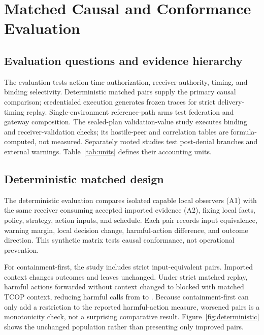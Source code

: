 \section{Matched Causal and Conformance Evaluation}

\subsection{Evaluation questions and evidence hierarchy}

The evaluation tests action-time authorization, receiver authority, timing, and binding selectivity. Deterministic matched pairs supply the primary causal comparison; credentialed execution generates frozen traces for strict delivery-timing replay. Single-environment reference-path arms test federation and gateway composition. The sealed-plan validation-value study executes binding and receiver-validation checks; its hostile-peer and correlation tables are formula-computed, not measured. Separately rooted studies test post-denial branches and external warnings. Table~\ref{tab:units} defines their accounting units.



\subsection{Deterministic matched design}

The deterministic evaluation compares isolated capable local observers (A1) with the same receiver consuming accepted imported evidence (A2), fixing local facts, policy, strategy, action inputs, and schedule. Each pair records input equivalence, warning margin, local decision change, harmful-action difference, and outcome direction. This synthetic matrix tests causal conformance, not operational prevention.

For containment-first, the study includes \DeterministicPairs{} strict input-equivalent pairs. Imported context changes \DeterministicImproved{} outcomes and leaves \DeterministicUnchanged{} unchanged. Under strict matched replay, \DeterministicActionsPrevented{} harmful actions forwarded without context changed to blocked with matched TCOP context, reducing harmful calls from \DeterministicBaselineHarmfulCalls{} to \DeterministicTreatmentHarmfulCalls{}. Because containment-first can only add a restriction to the reported harmful-action measure, \DeterministicWorsened{} worsened pairs is a monotonicity check, not a surprising comparative result. Figure~\ref{fig:deterministic} shows the unchanged population rather than presenting only improved pairs.

